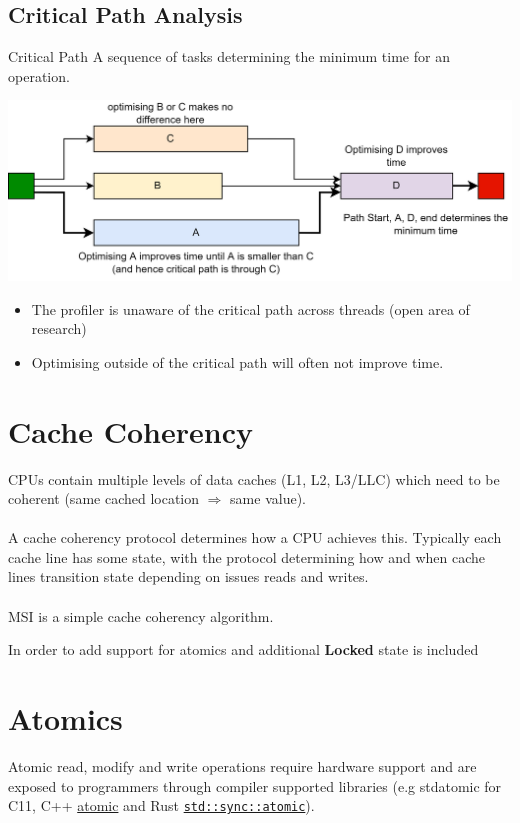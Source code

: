 \subsection{Critical Path Analysis}
\begin{definitionbox}{Critical Path}
    A sequence of tasks determining the minimum time for an operation.
    \begin{center}
        \includegraphics[width=.8\textwidth]{parallelism/images/critical_path.drawio.png}
    \end{center}
    \begin{itemize}
        \item The profiler is unaware of the critical path across threads (open area of research)
        \item Optimising outside of the critical path will often not improve time.
    \end{itemize}
\end{definitionbox}


\section{Cache Coherency}
CPUs contain multiple levels of data caches (L1, L2, L3/LLC) which need to be coherent (same cached location $\Rightarrow$ same value).
\\
\\ A cache coherency protocol determines how a CPU achieves this. Typically each cache line has some state, with the protocol determining how and when cache lines transition state depending on issues reads and writes.
\\
\\ MSI is a simple cache coherency algorithm.


\unfinished

In order to add support for atomics and additional \textbf{Locked} state is included

\section{Atomics}
Atomic read, modify and write operations require hardware support and are exposed
 to programmers through compiler supported libraries (e.g stdatomic for C11, C++ \href{https://en.cppreference.com/w/cpp/atomic}{atomic} and Rust \href{https://doc.rust-lang.org/std/sync/atomic/}{\texttt{std::sync::atomic}}).

